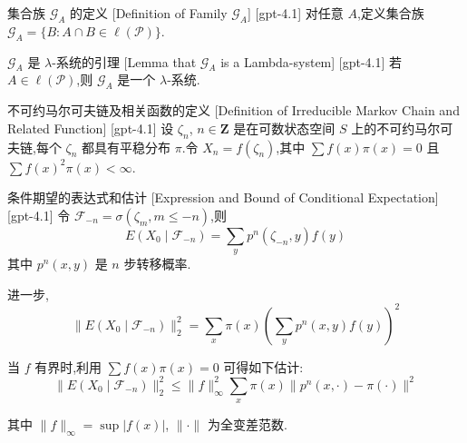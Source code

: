 \documentclass[UTF8]{ctexart}
\begin{document}
    
    
    \begin{dfn}
        {集合族 $\mathcal{G}_A$ 的定义}
        [Definition of Family $\mathcal{G}_A$]
        [gpt-4.1]
        对任意 $A$,定义集合族 $\mathcal{G}_A = \{ B : A \cap B \in \ell(\mathcal{P}) \}$.
    \end{dfn}
    
    
    
    \begin{lma}
        {$\mathcal{G}_A$ 是 $\lambda$-系统的引理}
        [Lemma that $\mathcal{G}_A$ is a Lambda-system]
        [gpt-4.1]
        若 $A \in \ell(\mathcal{P})$,则 $\mathcal{G}_A$ 是一个 $\lambda$-系统.
    \end{lma}
    
    
    
    \begin{dfn}
        {不可约马尔可夫链及相关函数的定义}
        [Definition of Irreducible Markov Chain and Related Function]
        [gpt-4.1]
        设 $\zeta_{n}$, $n \in \mathbf{Z}$ 是在可数状态空间 $S$ 上的不可约马尔可夫链,每个 $\zeta_{n}$ 都具有平稳分布 $\pi$.令 $X_{n} = f(\zeta_{n})$,其中 $\sum f(x)\pi(x) = 0$ 且 $\sum f(x)^{2} \pi(x) < \infty$.
    \end{dfn}
    
    
    
    \begin{ppt}
        {条件期望的表达式和估计}
        [Expression and Bound of Conditional Expectation]
        [gpt-4.1]
        令 $\mathcal{F}_{-n} = \sigma(\zeta_{m}, m \leq -n)$,则
\[
E(X_{0} \mid \mathcal{F}_{-n}) = \sum_{y} p^{n}(\zeta_{-n}, y) f(y)
\]
其中 $p^{n}(x, y)$ 是 $n$ 步转移概率.

进一步,
\[
\|E(X_{0} \mid \mathcal{F}_{-n})\|_{2}^{2} = \sum_{x} \pi(x) \left( \sum_{y} p^{n}(x, y) f(y) \right)^{2}
\]

当 $f$ 有界时,利用 $\sum f(x)\pi(x) = 0$ 可得如下估计:
\[
\|E(X_{0} \mid \mathcal{F}_{-n})\|_{2}^{2} \leq \|f\|_{\infty}^{2} \sum_{x} \pi(x) \|p^{n}(x, \cdot) - \pi(\cdot)\|^{2}
\]

其中 $\| f \|_{\infty} = \sup |f(x)|$, $\| \cdot \|$ 为全变差范数.
    \end{ppt}
    
    
    
\end{document}
